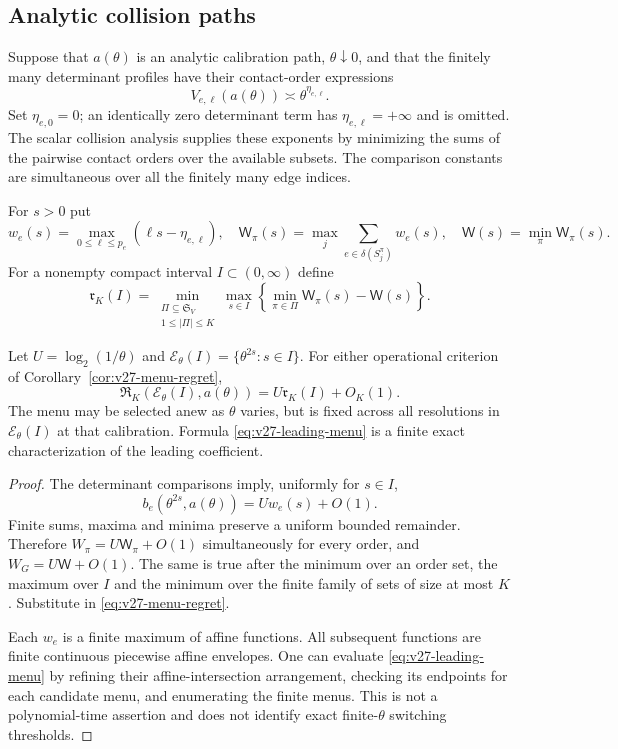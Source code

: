 \subsection{Analytic collision paths}
Suppose that $a(\theta)$ is an analytic calibration path, $\theta\downarrow0$, and that the finitely many determinant profiles have their contact-order expressions
\[
       V_{e,\ell}(a(\theta))\asymp\theta^{\eta_{e,\ell}}.
\]
Set $\eta_{e,0}=0$; an identically zero determinant term has $\eta_{e,\ell}=+\infty$ and is omitted. The scalar collision analysis supplies these exponents by minimizing the sums of the pairwise contact orders over the available subsets. The comparison constants are simultaneous over all the finitely many edge indices.

For $s>0$ put
\[
 w_e(s)=\max_{0\le\ell\le p_e}(\ell s-\eta_{e,\ell}),\quad
 \mathsf W_\pi(s)=\max_j\sum_{e\in\delta(S_j^\pi)}w_e(s),\quad
 \mathsf W(s)=\min_\pi\mathsf W_\pi(s).
\]
For a nonempty compact interval $I\subset(0,\infty)$ define
\begin{equation}\label{eq:v27-leading-menu}
 \mathfrak r_K(I)=
 \min_{\substack{\Pi\subseteq\mathfrak S_V\\1\le|\Pi|\le K}}
 \max_{s\in I}
       \left\{\min_{\pi\in\Pi}\mathsf W_\pi(s)-\mathsf W(s)\right\}.
\end{equation}

\begin{corollary}
\label{cor:v27-contact-menu}
Let $U=\log_2(1/\theta)$ and
$\mathcal E_\theta(I)=\{\theta^{2s}:s\in I\}$. For either operational criterion of Corollary~\ref{cor:v27-menu-regret},
\begin{equation}\label{eq:v27-contact-menu}
 \mathfrak R_K(\mathcal E_\theta(I),a(\theta))
                          =U\mathfrak r_K(I)+O_K(1).
\end{equation}
The menu may be selected anew as $\theta$ varies, but is fixed across all resolutions in $\mathcal E_\theta(I)$ at that calibration. Formula \eqref{eq:v27-leading-menu} is a finite exact characterization of the leading coefficient.
\end{corollary}
\begin{proof}
The determinant comparisons imply, uniformly for $s\in I$,
\[
 b_e(\theta^{2s},a(\theta))=Uw_e(s)+O(1).
\]
Finite sums, maxima and minima preserve a uniform bounded remainder. Therefore $W_\pi=U\mathsf W_\pi+O(1)$ simultaneously for every order, and $W_G=U\mathsf W+O(1)$. The same is true after the minimum over an order set, the maximum over $I$ and the minimum over the finite family of sets of size at most $K$. Substitute in \eqref{eq:v27-menu-regret}.

Each $w_e$ is a finite maximum of affine functions. All subsequent functions are finite continuous piecewise affine envelopes. One can evaluate \eqref{eq:v27-leading-menu} by refining their affine-intersection arrangement, checking its endpoints for each candidate menu, and enumerating the finite menus. This is not a polynomial-time assertion and does not identify exact finite-$\theta$ switching thresholds.
\end{proof}

